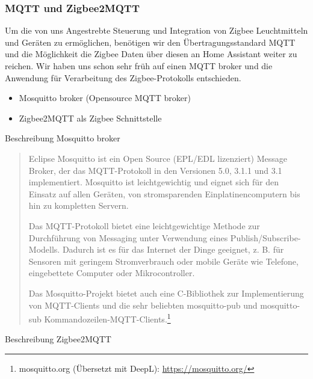 \subsubsection{MQTT und Zigbee2MQTT}\label{hwg_software_mqtt_zibee2mqtt}
Um die von uns Angestrebte Steuerung und Integration von Zigbee Leuchtmitteln und Geräten zu ermöglichen, benötigen wir den Übertragungsstandard MQTT und die Möglichkeit die Zigbee Daten über diesen an Home Assistant weiter zu reichen. 
Wir haben uns schon sehr früh auf einen MQTT broker und die Anwendung für Verarbeitung des Zigbee-Protokolls entschieden.
\begin{itemize}
    \item Mosquitto broker (Opensource MQTT broker)
    \item Zigbee2MQTT als Zigbee Schnittstelle
\end{itemize}
\noindent Beschreibung Mosquitto broker
\begin{quote}
    \color{quotetext}
 	    Eclipse Mosquitto ist ein Open Source (EPL/EDL lizenziert) Message Broker, der das MQTT-Protokoll in den Versionen 5.0, 3.1.1 und 3.1 implementiert. Mosquitto ist leichtgewichtig und eignet sich für den Einsatz auf allen Geräten, von stromsparenden Einplatinencomputern bis hin zu kompletten Servern.

        Das MQTT-Protokoll bietet eine leichtgewichtige Methode zur Durchführung von Messaging unter Verwendung eines Publish/Subscribe-Modells. Dadurch ist es für das Internet der Dinge geeignet, z. B. für Sensoren mit geringem Stromverbrauch oder mobile Geräte wie Telefone, eingebettete Computer oder Mikrocontroller.

        Das Mosquitto-Projekt bietet auch eine C-Bibliothek zur Implementierung von MQTT-Clients und die sehr beliebten mosquitto-pub und mosquitto-sub Kommandozeilen-MQTT-Clients.\footnote{mosquitto.org (Übersetzt mit DeepL): \url{https://mosquitto.org/}}
\end{quote}
\noindent Beschreibung Zigbee2MQTT
